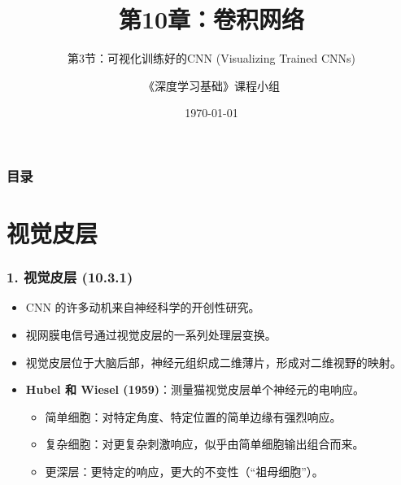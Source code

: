 \documentclass[t,aspectratio=169]{beamer} %
\title[10.3.可视化CNN]{第10章：卷积网络}
\subtitle{第3节：可视化训练好的CNN (Visualizing Trained CNNs)}
\author{《深度学习基础》课程小组}
\date{\today}
\begin{document}
\frame{\titlepage}

\begin{frame}
    \frametitle{目录}
    \tableofcontents
\end{frame}

\section{视觉皮层}

\begin{frame}
    \frametitle{1. 视觉皮层 (10.3.1)}
    \begin{itemize}
        \item CNN 的许多动机来自\alert{神经科学}的开创性研究。
        \item 视网膜电信号通过视觉皮层的一系列处理层变换。
        \item 视觉皮层位于大脑后部，神经元组织成\alert{二维薄片}，形成对二维视野的映射。
        \item \textbf{Hubel 和 Wiesel (1959)}：测量猫视觉皮层单个神经元的电响应。
        \begin{itemize}
            \item \alert{简单细胞}：对特定角度、特定位置的简单边缘有强烈响应。
            \item \alert{复杂细胞}：对更复杂刺激响应，似乎由简单细胞输出组合而来。
            \item 更深层：更特定的响应，更大的不变性（“祖母细胞”）。
        \end{itemize}
    \end{itemize}
\end{frame}
\end{document}
